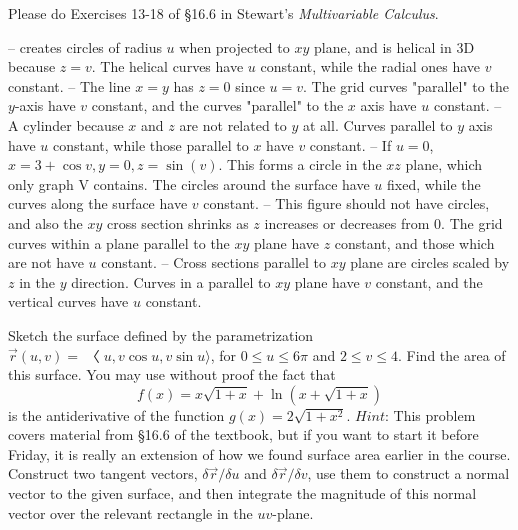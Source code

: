 \documentclass[12pt]{exam}
\begin{document}
\begin{questions}
\setcounter{question}{7}
\question Please do Exercises 13-18 of §16.6 in Stewart’s \textit{Multivariable Calculus}.
    \begin{solution}
        \begin{questions}
            \setcounter{question}{12}
            \question {} -- creates circles of radius $u$ when projected to $xy$ plane, and is helical in 3D because $z = v$. The helical curves have $u$ constant, while the radial ones have $v$ constant.
            \question {} -- The line $x=y$ has $z=0$ since $u=v$. The grid curves "parallel" to the $y$-axis have $v$ constant, and the curves "parallel" to the $x$ axis have $u$ constant.
            \question {} -- A cylinder because $x$ and $z$ are not related to $y$ at all. Curves parallel to $y$ axis have $u$ constant, while those parallel to $x$ have $v$ constant.
            \question {} -- If $u=0$, $x = 3 + \cos v, y = 0, z = \sin(v)$. This forms a circle in the $xz$ plane, which only graph V contains. The circles around the surface have $u$ fixed, while the curves along the surface have $v$ constant.
            \question {} -- This figure should not have circles, and also the $xy$ cross section shrinks as $z$ increases or decreases from 0. The grid curves within a plane parallel to the $xy$ plane have $z$ constant, and those which are not have $u$ constant.
            \question  {} -- Cross sections parallel to $xy$ plane are circles scaled by $z$ in the $y$ direction. Curves in a parallel to $xy$ plane have $v$ constant, and the vertical curves have $u$ constant.
        \end{questions}
    \end{solution}
    \clearpage
\setcounter{question}{8}
\question Sketch the surface defined by the parametrization $\overrightarrow{r} (u, v) = 〈u, v \cos u, v \sin u \rangle$, for $0 \leq u \leq 6\pi$ and $2 \leq v \leq 4$. Find the area of this surface. You may use without proof the fact that
\[f (x) = x\sqrt{1 + x} + \ln(x + \sqrt{1 + x})\]
is the antiderivative of the function $g(x) = 2\sqrt{1 + x^2}$. $Hint$: This problem covers material from §16.6 of the textbook, but if you want to start it before Friday, it is really an extension of how we found surface area earlier in the course. Construct two tangent vectors, $\delta \overrightarrow{r} / \delta u$ and $\delta \overrightarrow{r} / \delta v$, use them to construct a normal vector to the given surface, and then integrate the magnitude of this normal vector over the relevant rectangle in the $uv$-plane.

\end{questions}
\end{document}
